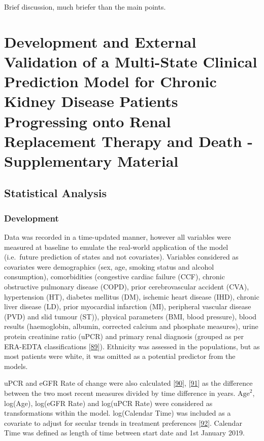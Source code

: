 \documentclass[12pt,PhD,twoside,openright]{muthesis}
\begin{document}
Brief discussion, much briefer than the main points.

\hypertarget{chap-dev-paper-supp}{%
\chapter{Development and External Validation of a Multi-State Clinical Prediction Model for Chronic Kidney Disease Patients Progressing onto Renal Replacement Therapy and Death - Supplementary Material}\label{chap-dev-paper-supp}}


\hypertarget{statistical-analysis}{%
\section{Statistical Analysis}\label{statistical-analysis}}

\hypertarget{development}{%
\subsection{Development}\label{development}}

Data was recorded in a time-updated manner, however all variables were measured at baseline to emulate the real-world application of the model (i.e.~future prediction of states and not covariates). Variables considered as covariates were demographics (sex, age, smoking status and alcohol consumption), comorbidities (congestive cardiac failure (CCF), chronic obstructive pulmonary disease (COPD), prior cerebrovascular accident (CVA), hypertension (HT), diabetes mellitus (DM), ischemic heart disease (IHD), chronic liver disease (LD), prior myocardial infarction (MI), peripheral vascular disease (PVD) and slid tumour (ST)), physical parameters (BMI, blood pressure), blood results (haemoglobin, albumin, corrected calcium and phosphate measures), urine protein creatinine ratio (uPCR) and primary renal diagnosis (grouped as per ERA-EDTA classifications {[}\protect\hyperlink{ref-venkat-raman_new_2012}{89}{]}). Ethnicity was assessed in the populations, but as most patients were white, it was omitted as a potential predictor from the models.

uPCR and eGFR Rate of change were also calculated {[}\protect\hyperlink{ref-kovesdy_past_2016}{90}{]}, {[}\protect\hyperlink{ref-naimark_past_2016}{91}{]} as the difference between the two most recent measures divided by time difference in years. \(\textrm{Age}^2\), log(Age), log(eGFR Rate) and log(uPCR Rate) were considered as transformations within the model. log(Calendar Time) was included as a covariate to adjust for secular trends in treatment preferences {[}\protect\hyperlink{ref-bhatnagar_epidemiology_2015}{92}{]}. Calendar Time was defined as length of time between start date and 1st January 2019.
\end{document}
